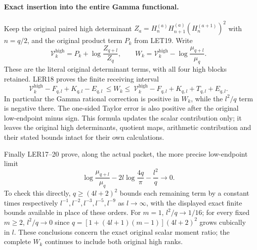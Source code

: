 \paragraph{Exact insertion into the entire Gamma functional.}
Keep the original paired high determinant
$Z_a=H_n^{(a)}H_{n+1}^{(a)}(H_n^{(a+1)})^2$ with $n=q/2$, and
the original product term $P_k$ from LET19. Write
\[
 \mathcal V_k^{\mathrm{high}}=P_k+\log\frac{Z_{q+l}}{Z_q},\qquad
 W_k=\mathcal V_k^{\mathrm{high}}-\log\frac{\mu_{q+l}}{\mu_q}.
 \tag{LER21}
\]
These are the literal original determinant terms, with all four
high blocks retained. LER18 proves the finite receiving interval
\[
 \boxed{\displaystyle
 \mathcal V_k^{\mathrm{high}}-F_{q,l}+K_{q,l}-E_{q,l}
 \ \le W_k\le\
 \mathcal V_k^{\mathrm{high}}-F_{q,l}+K_{q,l}+T_{q,l}+E_{q,l}.}
 \tag{LER22}
\]
In particular the Gamma rational correction is positive in $W_k$,
while the $l^2/q$ term is negative there. The one-sided Taylor error
is also positive after the original low-endpoint minus sign.
This formula updates the scalar contribution only; it leaves the
original high determinants, quotient maps, arithmetic contribution
and their stated bounds intact for their own calculations.

Finally LER17--20 prove, along the actual packet, the more precise
low-endpoint limit
\[
 \log\frac{\mu_{q+l}}{\mu_q}-2l\log\frac{4q}{\pi}
 -\frac{l^2}{q}\longrightarrow0.
 \tag{LER23}
\]
To check this directly, $q\ge(4l+2)^2$ bounds each remaining term by
a constant times respectively $l^{-1},l^{-2},l^{-3},l^{-5},l^{-9}$
as $l\to\infty$, with the displayed exact finite bounds available
in place of these orders. For $m=1$, $l^2/q\to1/16$; for every
fixed $m\ge2$, $l^2/q\to0$ since
$q=[1+(4l+1)(m-1)](4l+2)^2$ grows cubically in $l$.
These conclusions concern the exact original scalar moment ratio;
the complete $W_k$ continues to include both original high ranks.
